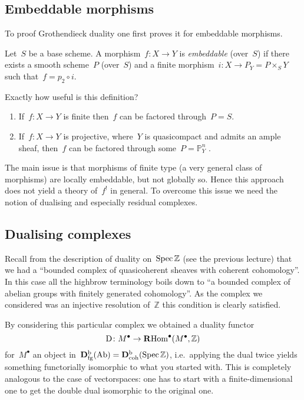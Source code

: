 \documentclass[10pt,a4paper]{article}
\begin{document}
\subsection{Embeddable morphisms}
\label{subsection:embeddable-morphisms}
To proof Grothendieck duality one first proves it for embeddable morphisms.
\begin{definition}
  Let~$S$ be a base scheme. A morphism~$f\colon X\to Y$ is \emph{embeddable} (over~$S$) if there exists a smooth scheme~$P$ (over~$S$) and a finite morphism~$i\colon X\to P_Y=P\times_SY$ such that~$f=p_2\circ i$.
\end{definition}
Exactly how useful is this definition?
\begin{enumerate}
  \item If~$f\colon X\to Y$ is finite then~$f$ can be factored through~$P=S$.
  \item If~$f\colon X\to Y$ is projective, where~$Y$ is quasicompact and admits an ample sheaf, then~$f$ can be factored through some~$P=\mathbb{P}_Y^n$ \cite[II.5.5.4(ii)]{egaII}.
\end{enumerate}
The main issue is that morphisms of finite type (a very general class of morphisms) are locally embeddable, but not globally so. Hence this approach does not yield a theory of~$f^!$ in general. To overcome this issue we need the notion of dualising and especially residual complexes.

\subsection{Dualising complexes}
\label{subsection:dualising-complexes}
Recall from the description of duality on~$\operatorname{Spec}\mathbb{Z}$ (see the previous lecture) that we had a ``bounded complex of quasicoherent sheaves with coherent cohomology''. In this case all the highbrow terminology boils down to ``a bounded complex of abelian groups with finitely generated cohomology''. As the complex we considered was an injective resolution of~$\mathbb{Z}$ this condition is clearly satisfied.

By considering this particular complex we obtained a duality functor
\begin{equation}
  \operatorname{D}\colon M^\bullet\to\operatorname{\mathbf{R}Hom}^\bullet(M^\bullet,\mathbb{Z})
\end{equation}
for~$M^\bullet$ an object in~$\mathbf{D}_{\mathrm{fg}}^{\mathrm{b}}(\mathrm{Ab})=\mathbf{D}_{\mathrm{coh}}^{\mathrm{b}}(\operatorname{Spec}\mathbb{Z})$, i.e.\ applying the dual twice yields something functorially isomorphic to what you started with. This is completely analogous to the case of vectorspaces: one has to start with a finite-dimensional one to get the double dual isomorphic to the original one.
\end{document}
